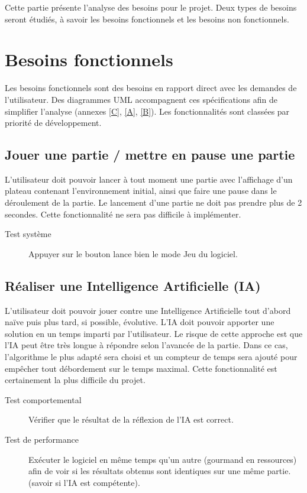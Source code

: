 Cette partie présente l'analyse des besoins pour le projet. Deux types de besoins seront étudiés, à savoir les besoins fonctionnels et les besoins non fonctionnels.

\section{Besoins fonctionnels}

Les besoins fonctionnels sont des besoins en rapport direct avec les
demandes de l'utilisateur. Des diagrammes UML accompagnent ces
spécifications afin de simplifier l'analyse (annexes \ref{C}, \ref{A}, \ref{B}). Les fonctionnalités sont classées par priorité de développement.

\subsection{Jouer une partie / mettre en pause une partie}
L’utilisateur doit pouvoir lancer à tout moment une partie avec l'affichage d'un plateau contenant l’environnement initial, ainsi que faire une pause dans le déroulement de la partie. Le lancement d'une partie ne doit pas prendre plus de 2 secondes. Cette fonctionnalité ne sera pas difficile à implémenter.

\begin{description}
\item[Test système] Appuyer sur le bouton lance bien le mode Jeu du logiciel.
\end{description}

\subsection{Réaliser une Intelligence Artificielle (IA) }
\label{IA}
L'utilisateur doit pouvoir jouer contre une Intelligence Artificielle tout d'abord naïve puis plus tard, si possible, évolutive. L'IA doit pouvoir apporter une solution en un temps imparti par l'utilisateur. Le risque de cette approche est que l'IA peut être très longue à répondre selon l'avancée de la partie. Dans ce cas, l'algorithme le plus adapté sera choisi et un compteur de temps sera ajouté pour empêcher tout débordement sur le temps maximal. Cette fonctionnalité est certainement la plus difficile du projet.

\begin{description}
\item[Test comportemental] Vérifier que le résultat de la réflexion de l’IA est correct.
\item[Test de performance] Exécuter le logiciel en même temps qu’un autre (gourmand en ressources) afin de voir si les résultats obtenus sont identiques sur une même partie. (savoir si l’IA est compétente).
\end{description}

